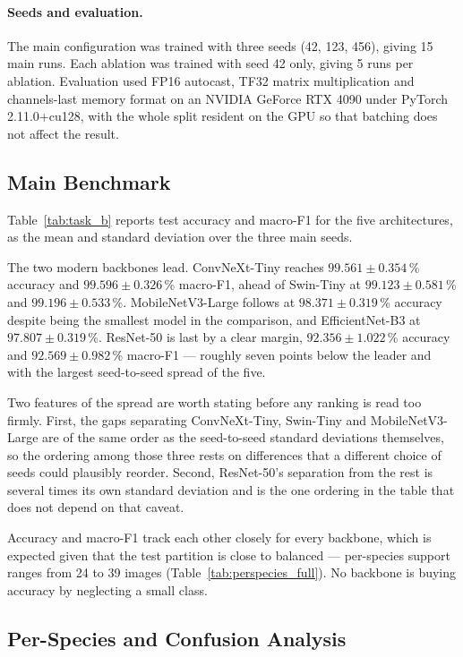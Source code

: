 \paragraph{Seeds and evaluation.} The main configuration was trained with
three seeds (42, 123, 456), giving 15 main runs. Each ablation was trained
with seed 42 only, giving 5 runs per ablation. Evaluation used FP16
autocast, TF32 matrix multiplication and channels-last memory format on an
NVIDIA GeForce RTX 4090 under PyTorch 2.11.0+cu128, with the whole split
resident on the GPU so that batching does not affect the result.

\subsection{Main Benchmark}
\label{sec:results:benchmark}

Table~\ref{tab:task_b} reports test accuracy and macro-F1 for the five
architectures, as the mean and standard deviation over the three main seeds.

The two modern backbones lead. ConvNeXt-Tiny reaches
$99.561 \pm 0.354$\,\% accuracy and $99.596 \pm 0.326$\,\% macro-F1,
ahead of Swin-Tiny at $99.123 \pm 0.581$\,\% and
$99.196 \pm 0.533$\,\%. MobileNetV3-Large follows at
$98.371 \pm 0.319$\,\% accuracy despite being the smallest model in the
comparison, and EfficientNet-B3 at $97.807 \pm 0.319$\,\%. ResNet-50 is
last by a clear margin, $92.356 \pm 1.022$\,\% accuracy and
$92.569 \pm 0.982$\,\% macro-F1 --- roughly seven points below the leader
and with the largest seed-to-seed spread of the five.

Two features of the spread are worth stating before any ranking is read too
firmly. First, the gaps separating ConvNeXt-Tiny, Swin-Tiny and
MobileNetV3-Large are of the same order as the seed-to-seed standard
deviations themselves, so the ordering among those three rests on
differences that a different choice of seeds could plausibly reorder.
Second, ResNet-50's separation from the rest is several times its own
standard deviation and is the one ordering in the table that does not depend
on that caveat.

Accuracy and macro-F1 track each other closely for every backbone, which is
expected given that the test partition is close to balanced --- per-species
support ranges from 24 to 39 images (Table~\ref{tab:perspecies_full}). No
backbone is buying accuracy by neglecting a small class.

\subsection{Per-Species and Confusion Analysis}
\label{sec:results:perspecies}

